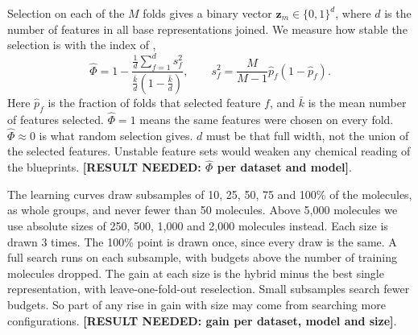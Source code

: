 Selection on each of the $M$ folds gives a binary vector $\mathbf{z}_m \in \{0,1\}^d$, where $d$ is the number of features in all base representations joined. We measure how stable the selection is with the index of \citet{Nogueira2018},
\[
\hat\Phi = 1 - \frac{\frac1d\sum_{f=1}^d s_f^2}{\frac{\bar k}{d}\left(1-\frac{\bar k}{d}\right)}, \qquad s_f^2 = \frac{M}{M-1}\hat p_f(1-\hat p_f).
\]
Here $\hat p_f$ is the fraction of folds that selected feature $f$, and $\bar k$ is the mean number of features selected. $\hat\Phi=1$ means the same features were chosen on every fold. $\hat\Phi \approx 0$ is what random selection gives. $d$ must be that full width, not the union of the selected features. Unstable feature sets would weaken any chemical reading of the blueprints. \textbf{[RESULT NEEDED: $\hat\Phi$ per dataset and model]}.

The learning curves draw subsamples of 10, 25, 50, 75 and 100\% of the molecules, as whole groups, and never fewer than 50 molecules. Above 5,000 molecules we use absolute sizes of 250, 500, 1,000 and 2,000 molecules instead. Each size is drawn 3 times. The 100\% point is drawn once, since every draw is the same. A full search runs on each subsample, with budgets above the number of training molecules dropped. The gain at each size is the hybrid minus the best single representation, with leave-one-fold-out reselection. Small subsamples search fewer budgets. So part of any rise in gain with size may come from searching more configurations. \textbf{[RESULT NEEDED: gain per dataset, model and size]}.

